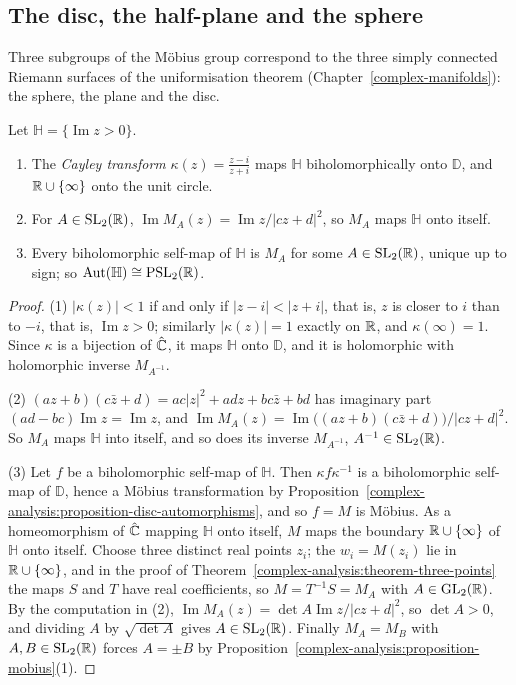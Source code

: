 \subsection{The disc, the half-plane and the sphere}\label{complex-analysis:subsection-mobius-subgroups}

Three subgroups of the M\"obius group correspond to the three simply connected Riemann surfaces of the uniformisation theorem (Chapter~\ref{complex-manifolds}): the sphere, the plane and the disc.

\begin{proposition}\label{complex-analysis:proposition-half-plane}
Let $\mathbb{H} = \{\operatorname{Im}z > 0\}$.
\begin{enumerate}
\item The \emph{Cayley transform} $\kappa(z) = \frac{z - i}{z + i}$ maps $\mathbb{H}$ biholomorphically onto $\mathbb{D}$, and $\mathbb{R} \cup \{\infty\}$ onto the unit circle.
\item For $A \in \mathrm{SL}_2(\mathbb{R})$, $\operatorname{Im}M_A(z) = \operatorname{Im}z/|cz + d|^2$, so $M_A$ maps $\mathbb{H}$ onto itself.
\item Every biholomorphic self-map of $\mathbb{H}$ is $M_A$ for some $A \in \mathrm{SL}_2(\mathbb{R})$, unique up to sign; so $\mathrm{Aut}(\mathbb{H}) \cong \mathrm{PSL}_2(\mathbb{R})$.
\end{enumerate}
\end{proposition}

\begin{proof}
(1) $|\kappa(z)| < 1$ if and only if $|z - i| < |z + i|$, that is, $z$ is closer to $i$ than to $-i$, that is, $\operatorname{Im}z > 0$; similarly $|\kappa(z)| = 1$ exactly on $\mathbb{R}$, and $\kappa(\infty) = 1$. Since $\kappa$ is a
bijection of $\hat{\mathbb{C}}$, it maps $\mathbb{H}$ onto $\mathbb{D}$, and it is holomorphic with holomorphic inverse $M_{A^{-1}}$.

(2) $(az + b)(c\bar z + d) = ac|z|^2 + adz + bc\bar z + bd$ has imaginary part $(ad - bc)\operatorname{Im}z = \operatorname{Im}z$, and $\operatorname{Im}M_A(z) = \operatorname{Im}\bigl((az + b)(c\bar z + d)\bigr)/|cz + d|^2$. So $M_A$
maps $\mathbb{H}$ into itself, and so does its inverse $M_{A^{-1}}$, $A^{-1} \in \mathrm{SL}_2(\mathbb{R})$.

(3) Let $f$ be a biholomorphic self-map of $\mathbb{H}$. Then $\kappa f\kappa^{-1}$ is a biholomorphic self-map of $\mathbb{D}$, hence a M\"obius transformation by
Proposition~\ref{complex-analysis:proposition-disc-automorphisms}, and so $f = M$ is M\"obius. As a homeomorphism of $\hat{\mathbb{C}}$ mapping $\mathbb{H}$ onto itself, $M$ maps the boundary $\mathbb{R} \cup \{\infty\}$ of $\mathbb{H}$ onto
itself. Choose three distinct real points $z_i$; the $w_i = M(z_i)$ lie in $\mathbb{R} \cup \{\infty\}$, and in the proof of Theorem~\ref{complex-analysis:theorem-three-points} the maps $S$ and $T$ have real coefficients, so
$M = T^{-1}S = M_A$ with $A \in \mathrm{GL}_2(\mathbb{R})$. By the computation in (2), $\operatorname{Im}M_A(z) = \det A\operatorname{Im}z/|cz + d|^2$, so $\det A > 0$, and dividing $A$ by $\sqrt{\det A}$ gives $A \in \mathrm{SL}_2(\mathbb{R})$. Finally
$M_A = M_B$ with $A, B \in \mathrm{SL}_2(\mathbb{R})$ forces $A = \pm B$ by Proposition~\ref{complex-analysis:proposition-mobius}(1).
\end{proof}

